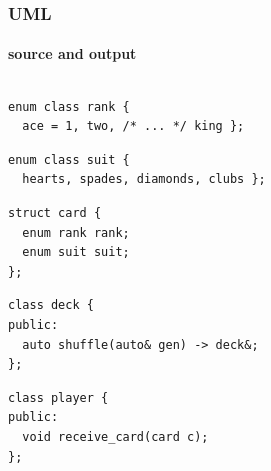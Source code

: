 \documentclass[compress,table,xcolor=table]{beamer}
\begin{document}
\begin{frame}[fragile]
  \frametitle{UML}
  \framesubtitle{source and output}
  \begin{columns}
    \begin{column}{.72\textwidth}
    \begin{lstlisting}[language=c++2x,basicstyle=\scriptsize\ttfamily]
enum class rank {
  ace = 1, two, /* ... */ king };
    \end{lstlisting}
    \begin{lstlisting}[language=c++2x,basicstyle=\scriptsize\ttfamily]
enum class suit {
  hearts, spades, diamonds, clubs };
    \end{lstlisting}
    \begin{lstlisting}[language=c++2x,basicstyle=\scriptsize\ttfamily]
struct card {
  enum rank rank;
  enum suit suit;
};
    \end{lstlisting}
    \begin{lstlisting}[language=c++2x,basicstyle=\scriptsize\ttfamily]
class deck {
public:
  auto shuffle(auto& gen) -> deck&;
};
    \end{lstlisting}
    \begin{lstlisting}[language=c++2x,basicstyle=\scriptsize\ttfamily]
class player {
public:
  void receive_card(card c);
};
    \end{lstlisting}
    \end{column}
    \begin{column}{.27\textwidth}
      \colorbox{gray}{
        \begin{minipage}{\dimexpr\textwidth\relax}
        \centering

\end{minipage}}
\end{column}
\end{columns}
\end{frame}
\end{document}
